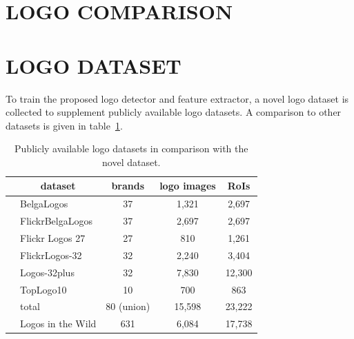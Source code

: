 \documentclass[a4paper,twoside]{article}
\newcommand{\vertboxs}[1]{\rotatebox{90}{\parbox{14mm}{\centering #1}}}
\newcommand{\vertboxt}[1]{\rotatebox{90}{\parbox{10mm}{\centering #1}}}
\begin{document}
\section{\uppercase{Logo Comparison}}


\section{\uppercase{Logo Dataset}}
\noindent To train the proposed logo detector and feature extractor, a novel logo dataset is collected to supplement publicly available logo datasets. A comparison to other datasets is given in table~\ref{tab:logoDatasets}.
%
\begin{table}[t]
\centering
\caption{Publicly available logo datasets in comparison with the novel dataset.}
\label{tab:logoDatasets}
\begin{small}
\begin{tabular}{cl|ccc}
& \multicolumn{1}{c|}{\textbf{dataset}} & \textbf{brands} & \textbf{logo images} & \textbf{RoIs} \bigstrut[b]\\
\hline
\multirow{8}{*}{\vertboxs{public}} & BelgaLogos \cite{joly2009,letessier2012} & 37 & 1,321 & 2,697 \bigstrut[t] \\
& FlickrBelgaLogos \cite{letessier2012} & 37 & 2,697 & 2,697 \\
& Flickr Logos 27 \cite{kalantidis2011} & 27 & 810 & 1,261 \\
& FlickrLogos-32 \cite{romberg2011} & 32 & 2,240 & 3,404 \\
& Logos-32plus \cite{bianco2015,bianco2017} & 32 & 7,830 & 12,300 \\
& TopLogo10 \cite{su2016} & 10 & 700 & 863 \bigstrut[b] \\
\cline{2-5}
& total & 80 (union) & 15,598 & 23,222 \bigstrut \\
\hline
\begin{minipage}[c]{0.1cm}\vertboxt{new}\end{minipage} & Logos in the Wild & 631 & 6,084 & 17,738 \bigstrut[t]
\end{tabular}
\end{small}
\end{table}
\end{document}
